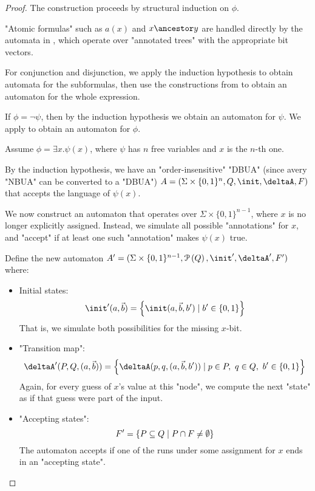 \documentclass[a4paper,UKenglish,cleveref, autoref, thm-restate]{lipics-v2021}
\begin{document}
\begin{proof}
	The construction proceeds by structural induction on $\phi$.

	"Atomic formulas" such as $a(x)$ and $x \ancestor y$ are handled directly by the automata
	in , which operate over "annotated trees" with the appropriate bit vectors.

	For conjunction and disjunction, we apply the induction hypothesis to obtain automata
	for the subformulas, then use the constructions from  to obtain an automaton for the whole expression.

	If $\phi = \lnot \psi$, then by the induction hypothesis we obtain an automaton for $\psi$. We apply
	 to obtain an automaton for $\phi$.

	Assume $\phi = \exists x.\psi(x)$, where $\psi$ has $n$ free variables and $x$ is the $n$-th one.

	By the induction hypothesis, we have an "order-insensitive" "DBUA" (since avery "NBUA" can be converted to a "DBUA")
	$A = (\Sigma \times \{0,1\}^n, Q, \init, \deltaA, F)$ that accepts the language of $\psi(x)$.

	We now construct an automaton that operates over $\Sigma \times \{0,1\}^{n-1}$, where $x$ is no longer explicitly assigned.
	Instead, we simulate all possible "annotations" for $x$, and "accept" if at least one such "annotation" makes $\psi(x)$ true.

	Define the new automaton $A' = (\Sigma \times \{0,1\}^{n-1}, \parts Q, \init', \deltaA', F')$ where:
	\begin{itemize}
		\item Initial states:
		      \[
			      \init'(a, \vec{b}) = \setdef{ \init(a, \vec{b}, b')} {b' \in \{0,1\} }
		      \]
		      That is, we simulate both possibilities for the missing $x$-bit.
		\item "Transition map":
		      \[
			      \deltaA'(P, Q, (a, \vec{b})) = \setdef{ \deltaA(p, q, (a, \vec{b}, b'))} {p \in P,\ q \in Q,\ b' \in \{0,1\} }
		      \]
		      Again, for every guess of $x$’s value at this "node", we compute the next "state" as if that guess were part of the input.
		\item "Accepting states":
		      \[
			      F' = \left\{ P \subseteq Q \mid P \cap F \neq \emptyset \right\}
		      \]
		      The automaton accepts if one of the runs under some assignment for $x$ ends in an "accepting state".
	\end{itemize}


\end{proof}
\end{document}
